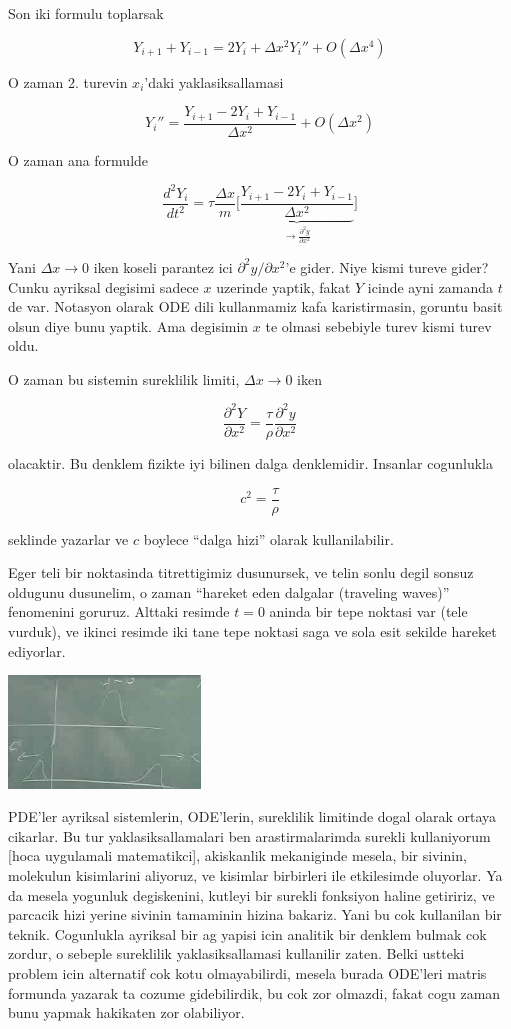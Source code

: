 \documentclass[12pt,fleqn]{article}
\begin{document}
Son iki formulu toplarsak

\[ Y_{i+1} + Y_{i-1} = 2Y_i + \Delta x^2 Y_i''  + O(\Delta x^4)\]

O zaman 2. turevin $x_i$'daki yaklasiksallamasi 

\[ Y_i'' = \frac{Y_{i+1} - 2Y_i + Y_{i-1}}{\Delta x^2} + O(\Delta x^2) \]

O zaman ana formulde

\[ \frac{d^2Y_i}{dt^2} = 
\tau \frac{\Delta x}{m} \bigg[\underbrace{
\frac{Y_{i+1} - 2Y_i + Y_{i-1}}{\Delta x^2}
}_{\to \frac{\partial ^2y}{\partial x^2}}
\bigg]
\]

Yani $\Delta x \to 0$ iken koseli parantez ici $\partial ^2y/\partial
x^2$'e gider. Niye kismi tureve gider? Cunku ayriksal degisimi sadece $x$
uzerinde yaptik, fakat $Y$ icinde ayni zamanda $t$ de var. Notasyon olarak
ODE dili kullanmamiz kafa karistirmasin, goruntu basit olsun diye bunu
yaptik. Ama degisimin $x$ te olmasi sebebiyle turev kismi turev oldu. 

O zaman bu sistemin sureklilik limiti, $\Delta x \to 0$ iken

\[ 
\frac{\partial ^2Y}{\partial x^2} = 
\frac{\tau}{\rho}\frac{\partial ^2y}{\partial x^2}
 \]

olacaktir. Bu denklem fizikte iyi bilinen dalga denklemidir. Insanlar
cogunlukla 

\[ c^2 = \frac{\tau}{\rho} \]

seklinde yazarlar ve $c$ boylece ``dalga hizi'' olarak kullanilabilir. 

Eger teli bir noktasinda titrettigimiz dusunursek, ve telin sonlu degil
sonsuz oldugunu dusunelim, o zaman ``hareket eden dalgalar (traveling
waves)'' fenomenini goruruz. Alttaki resimde $t=0$ aninda bir tepe noktasi
var (tele vurduk), ve ikinci resimde iki tane tepe noktasi saga ve sola
esit sekilde hareket ediyorlar. 

\includegraphics[height=3cm]{1_10.png}

PDE'ler ayriksal sistemlerin, ODE'lerin, sureklilik limitinde dogal olarak
ortaya cikarlar. Bu tur yaklasiksallamalari ben arastirmalarimda surekli
kullaniyorum [hoca uygulamali matematikci], akiskanlik mekaniginde mesela,
bir sivinin, molekulun kisimlarini aliyoruz, ve kisimlar birbirleri ile
etkilesimde oluyorlar. Ya da mesela yogunluk degiskenini, kutleyi bir
surekli fonksiyon haline getiririz, ve parcacik hizi yerine sivinin
tamaminin hizina bakariz. Yani bu cok kullanilan bir teknik. Cogunlukla
ayriksal bir ag yapisi icin analitik bir denklem bulmak cok zordur, o
sebeple sureklilik yaklasiksallamasi kullanilir zaten. Belki ustteki
problem icin alternatif cok kotu olmayabilirdi, mesela burada ODE'leri
matris formunda yazarak ta cozume gidebilirdik, bu cok zor olmazdi, fakat
cogu zaman bunu yapmak hakikaten zor olabiliyor.
\end{document}
